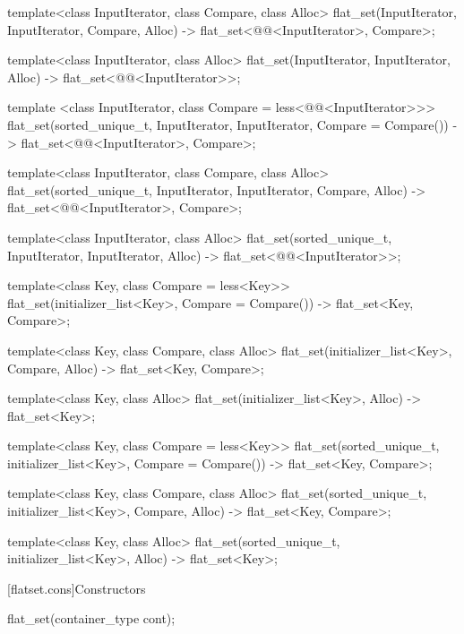 \begin{codeblock}
\begin{codeblock}
\begin{codeblock}
\begin{addedblock}
\begin{codeblock}
{  template<class InputIterator, class Compare, class Alloc>
    flat_set(InputIterator, InputIterator, Compare, Alloc)
      -> flat_set<@@<InputIterator>, Compare>;

  template<class InputIterator, class Alloc>
    flat_set(InputIterator, InputIterator, Alloc)
      -> flat_set<@@<InputIterator>>;

  template <class InputIterator, class Compare = less<@@<InputIterator>>>
    flat_set(sorted_unique_t, InputIterator, InputIterator, Compare = Compare())
      -> flat_set<@@<InputIterator>, Compare>;

  template<class InputIterator, class Compare, class Alloc>
    flat_set(sorted_unique_t, InputIterator, InputIterator, Compare, Alloc)
      -> flat_set<@@<InputIterator>, Compare>;

  template<class InputIterator, class Alloc>
    flat_set(sorted_unique_t, InputIterator, InputIterator, Alloc)
      -> flat_set<@@<InputIterator>>;

  template<class Key, class Compare = less<Key>>
    flat_set(initializer_list<Key>, Compare = Compare())
      -> flat_set<Key, Compare>;

  template<class Key, class Compare, class Alloc>
    flat_set(initializer_list<Key>, Compare, Alloc)
      -> flat_set<Key, Compare>;

  template<class Key, class Alloc>
    flat_set(initializer_list<Key>, Alloc)
      -> flat_set<Key>;

  template<class Key, class Compare = less<Key>>
    flat_set(sorted_unique_t, initializer_list<Key>, Compare = Compare())
      -> flat_set<Key, Compare>;

  template<class Key, class Compare, class Alloc>
    flat_set(sorted_unique_t, initializer_list<Key>, Compare, Alloc)
      -> flat_set<Key, Compare>;

  template<class Key, class Alloc>
    flat_set(sorted_unique_t, initializer_list<Key>, Alloc)
      -> flat_set<Key>;
}
\end{codeblock}

[flatset.cons]{Constructors}

%
\begin{itemdecl}
flat_set(container_type cont);
\end{itemdecl}


\end{addedblock}
\end{codeblock}
\end{codeblock}
\end{codeblock}
